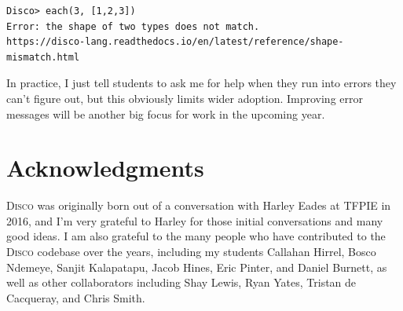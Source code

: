 \documentclass[copyright,creativecommons,11pt]{eptcs}
\newcommand{\disco}{\textsc{Disco}\xspace}
\begin{document}
{\small \begin{verbatim}
Disco> each(3, [1,2,3])
Error: the shape of two types does not match.
https://disco-lang.readthedocs.io/en/latest/reference/shape-mismatch.html
\end{verbatim}}

In practice, I just tell students to ask me for help when they run
into errors they can't figure out, but this obviously limits wider
adoption.  Improving error messages will be another big focus for work
in the upcoming year.

\section{Acknowledgments}
\label{sec:acks}

\disco was originally born out of a conversation with Harley Eades at
TFPIE in 2016, and I'm very grateful to Harley for those initial
conversations and many good ideas.  I am also grateful to the many
people who have contributed to the \disco codebase over the years,
including my students Callahan Hirrel, Bosco Ndemeye, Sanjit
Kalapatapu, Jacob Hines, Eric Pinter, and Daniel Burnett, as well as
other collaborators including Shay Lewis, Ryan Yates, Tristan de
Cacqueray, and Chris Smith.



\end{document}
